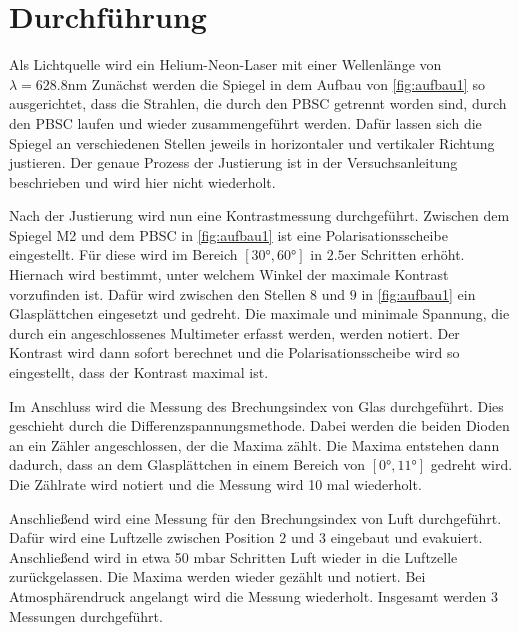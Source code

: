 \section{Durchführung}
\label{sec:Durchführung}

Als Lichtquelle wird ein Helium-Neon-Laser mit einer Wellenlänge von $\lambda = 628.8 \unit{\nano\meter}$
Zunächst werden die Spiegel in dem Aufbau von \autoref{fig:aufbau1} so ausgerichtet, dass die Strahlen, die durch den PBSC getrennt worden sind, durch den PBSC laufen und wieder zusammengeführt werden.
Dafür lassen sich die Spiegel an verschiedenen Stellen jeweils in horizontaler und vertikaler Richtung justieren.
Der genaue Prozess der Justierung ist in der Versuchsanleitung \cite{v64} beschrieben und wird hier nicht wiederholt.

Nach der Justierung wird nun eine Kontrastmessung durchgeführt.
Zwischen dem Spiegel M2 und dem PBSC in \autoref{fig:aufbau1} ist eine Polarisationsscheibe eingestellt.
Für diese wird im Bereich $[30°,60°]$ in $2.5$er Schritten erhöht.
Hiernach wird bestimmt, unter welchem Winkel der maximale Kontrast vorzufinden ist.
Dafür wird zwischen den Stellen $8$ und $9$ in \autoref{fig:aufbau1} ein Glasplättchen eingesetzt und gedreht.
Die maximale und minimale Spannung, die durch ein angeschlossenes Multimeter erfasst werden, werden notiert.
Der Kontrast wird dann sofort berechnet und die Polarisationsscheibe wird so eingestellt, dass der Kontrast maximal ist.

Im Anschluss wird die Messung des Brechungsindex von Glas durchgeführt.
Dies geschieht durch die Differenzspannungsmethode.
Dabei werden die beiden Dioden an ein Zähler angeschlossen, der die Maxima zählt.
Die Maxima entstehen dann dadurch, dass an dem Glasplättchen in einem Bereich von $[0°,11°]$ gedreht wird.
Die Zählrate wird notiert und die Messung wird 10 mal wiederholt.

Anschließend wird eine Messung für den Brechungsindex von Luft durchgeführt.
Dafür wird eine Luftzelle zwischen Position $2$ und $3$ eingebaut und evakuiert.
Anschließend wird in etwa 50 $\unit{\milli\bar}$ Schritten Luft wieder in die Luftzelle zurückgelassen.
Die Maxima werden wieder gezählt und notiert.
Bei Atmosphärendruck angelangt wird die Messung wiederholt.
Insgesamt werden 3 Messungen durchgeführt. 